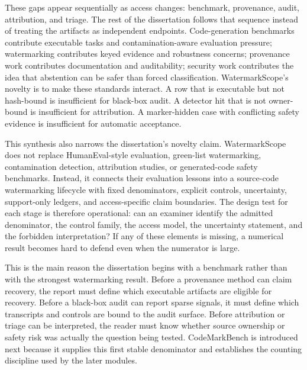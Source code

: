 These gaps appear sequentially as access changes: benchmark, provenance, audit, attribution, and triage. The rest of the dissertation follows that sequence instead of treating the artifacts as independent endpoints. Code-generation benchmarks contribute executable tasks and contamination-aware evaluation pressure; watermarking contributes keyed evidence and robustness concerns; provenance work contributes documentation and auditability; security work contributes the idea that abstention can be safer than forced classification. WatermarkScope's novelty is to make these standards interact. A row that is executable but not hash-bound is insufficient for black-box audit. A detector hit that is not owner-bound is insufficient for attribution. A marker-hidden case with conflicting safety evidence is insufficient for automatic acceptance.

This synthesis also narrows the dissertation's novelty claim. WatermarkScope does not replace HumanEval-style evaluation, green-list watermarking, contamination detection, attribution studies, or generated-code safety benchmarks. Instead, it connects their evaluation lessons into a source-code watermarking lifecycle with fixed denominators, explicit controls, uncertainty, support-only ledgers, and access-specific claim boundaries. The design test for each stage is therefore operational: can an examiner identify the admitted denominator, the control family, the access model, the uncertainty statement, and the forbidden interpretation? If any of these elements is missing, a numerical result becomes hard to defend even when the numerator is large.

This is the main reason the dissertation begins with a benchmark rather than with the strongest watermarking result. Before a provenance method can claim recovery, the report must define which executable artifacts are eligible for recovery. Before a black-box audit can report sparse signals, it must define which transcripts and controls are bound to the audit surface. Before attribution or triage can be interpreted, the reader must know whether source ownership or safety risk was actually the question being tested. CodeMarkBench is introduced next because it supplies this first stable denominator and establishes the counting discipline used by the later modules.

